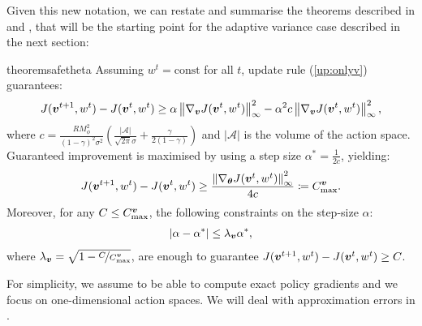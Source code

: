 Given this new notation, we can restate and summarise the theorems described in  and , that will be the starting point for the adaptive variance case described in the next section:
\begin{restatable}{theorem}{safetheta}\label{th:safetheta}
	Assuming $w^t = \text{const} $ for all $t$, update rule (\ref{up:onlyv}) guarantees:
	\begin{align}\label{stat:1_1}
	J(\vv^{t+1}, w^t) - J(\vv^t, w^t) \geq \alpha\norm[\infty]{\gradJ[\vv]{\vv^t,w^t}}^2 - 
	\alpha^2 c \norm[\infty]{\gradJ[\vv]{\vv^t,w^t}}^2,
	\end{align}
	where $c = \frac{RM_{\phi}^2}{(1-\gamma)^2\sigma^2}\left(\frac{|\mathcal{A}|}{\sqrt{2\pi}\sigma} +	\frac{\gamma}{2(1-\gamma)}\right)$ and  $|\mathcal{A}|$ is the volume of the action space. Guaranteed improvement is maximised by using a step size $\alpha^* = \frac{1}{2c}$, yielding:
	\begin{align}\label{stat:1_2}
	J(\vv^{t+1},w^t) - J(\vv^t,w^t) \geq \frac{\norm[\infty]{\gradJ{\vv^t,w^t}}^2}{4c}
	\coloneqq C_{\text{max}}^{\vv}.
	\end{align}
	Moreover, for any $C\leq C_{\text{max}}^{\vv}$, the following constraints on the step-size $\alpha$:
	\begin{align}\label{stat:1_3}
	|\alpha - \alpha^*| \leq \lambda_{\vv}\alpha^*, 
	\end{align}
	where $\lambda_{\vv}=\sqrt{1 - \nicefrac{C}{C_{\text{max}}^{\vv}}}$, are enough to guarantee $J(\vv^{t+1},w^t) - J(\vv^t,w^t)\geq C$.
\end{restatable}

For simplicity, we assume to be able to compute exact policy gradients and we focus on one-dimensional action spaces. We will deal with approximation errors in .

